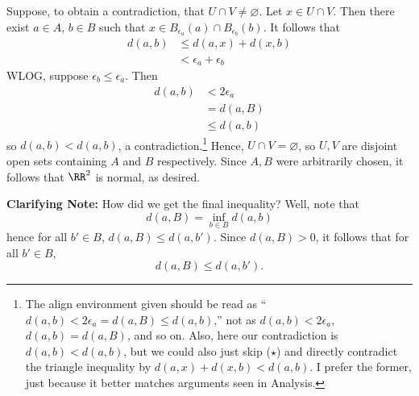 \documentclass{fkpset}
\begin{document}
\begin{solution}
    Suppose, to obtain a contradiction, that $U \cap V \neq
    \varnothing$. Let $x \in U \cap V$. Then there exist $a \in A$, $b
    \in B$ such that $x \in B_{\epsilon_a}(a) \cap B_{\epsilon_b}(b)$.
    It follows that
    \begin{align*}
      d(a,b)
      &\leq d(a,x) + d(x,b) \tag{$\star$}\\
      &< \epsilon_a + \epsilon_b
    \end{align*}
    WLOG, suppose $\epsilon_b \leq \epsilon_a$. Then
    \begin{align*}
      d(a,b)
      &< 2\epsilon_a \\
      &= d(a,B)  \\
      &\leq d(a,b)
    \end{align*}
    so $d(a,b) < d(a,b)$, a contradiction.\footnote{The align
      environment given should be read as ``$d(a,b) < 2\epsilon_a =
      d(a,B) \leq d(a,b)$,'' not as $d(a,b) < 2\epsilon_a$, $d(a,b) =
      d(a,B)$, and so on. Also, here our contradiction is $d(a,b) <
      d(a,b)$, but we could also just skip ($\star$) and directly
      contradict the triangle inequality by $d(a,x) + d(x,b) <
      d(a,b)$. I prefer the former, just because it better matches
      arguments seen in Analysis.}
    Hence, $U \cap V = \varnothing$, so $U,V$ are disjoint open sets
    containing $A$ and $B$ respectively. Since $A,B$ were arbitrarily
    chosen, it follows that $\RR^2$ is normal, as desired.
    \begin{leftbar}\small %
      \color{red} \textbf{Clarifying Note:} How did we get the final
      inequality? Well, note that
      \[
        d(a,B) = \inf_{b \in B} d(a,b)
      \]
      hence for all $b' \in B$, $d(a,B) \leq d(a,b')$. Since $d(a,B) >
      0$, it follows that for all $b' \in B$,
      \[
        d(a,B) \leq d(a,b').
      \]
    \end{leftbar}
  \end{solution}
  \clearpage

\end{document}
